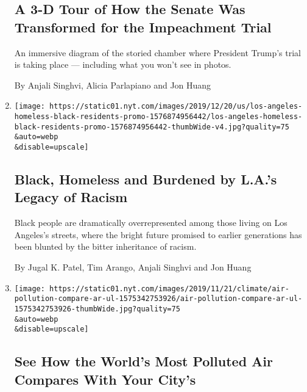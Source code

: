 \begin{enumerate}
{  \subsection{A 3-D Tour of How the Senate Was Transformed for the
  Impeachment
  Trial}\label{a-3-d-tour-of-how-the-senate-was-transformed-for-the-impeachment-trial}}

  An immersive diagram of the storied chamber where President Trump's
  trial is taking place --- including what you won't see in photos.

  By Anjali Singhvi, Alicia Parlapiano and Jon Huang
\item
  \href{/interactive/2019/12/22/us/los-angeles-homeless-black-residents.html}{}

  \texttt{[image: https://static01.nyt.com/images/2019/12/20/us/los-angeles-homeless-black-residents-promo-1576874956442/los-angeles-homeless-black-residents-promo-1576874956442-thumbWide-v4.jpg?quality=75\\\&auto=webp\\\&disable=upscale]}

  \hypertarget{black-homeless-and-burdened-by-las-legacy-of-racism}{%
  \subsection{Black, Homeless and Burdened by L.A.'s Legacy of
  Racism}\label{black-homeless-and-burdened-by-las-legacy-of-racism}}

  Black people are dramatically overrepresented among those living on
  Los Angeles's streets, where the bright future promised to earlier
  generations has been blunted by the bitter inheritance of racism.

  By Jugal K. Patel, Tim Arango, Anjali Singhvi and Jon Huang
\item
  \href{/interactive/2019/12/02/climate/air-pollution-compare-ar-ul.html}{}

  \texttt{[image: https://static01.nyt.com/images/2019/11/21/climate/air-pollution-compare-ar-ul-1575342753926/air-pollution-compare-ar-ul-1575342753926-thumbWide.jpg?quality=75\\\&auto=webp\\\&disable=upscale]}

  \hypertarget{see-how-the-worlds-most-polluted-air-compares-with-your-citys}{%
  \subsection{See How the World's Most Polluted Air Compares With Your
  City's}\label{see-how-the-worlds-most-polluted-air-compares-with-your-citys}}


\end{enumerate}
